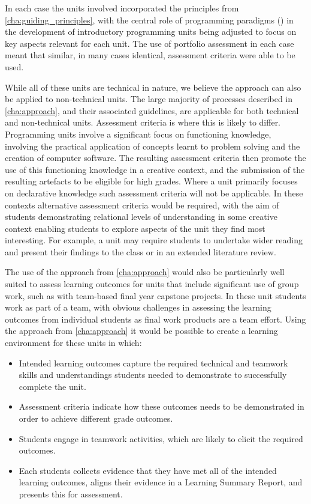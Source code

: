 In each case the units involved incorporated the principles from \cref{cha:guiding_principles}, with the central role of programming paradigms () in the development of introductory programming units being adjusted to focus on key aspects relevant for each unit. The use of portfolio assessment in each case meant that similar, in many cases identical, assessment criteria were able to be used.

While all of these units are technical in nature, we believe the approach can also be applied to non-technical units. The large majority of processes described in \cref{cha:approach}, and their associated guidelines, are applicable for both technical and non-technical units. Assessment criteria is where this is likely to differ. Programming units involve a significant focus on functioning knowledge, involving the practical application of concepts learnt to problem solving and the creation of computer software. The resulting assessment criteria then promote the use of this functioning knowledge in a creative context, and the submission of the resulting artefacts to be eligible for high grades. Where a unit primarily focuses on declarative knowledge such assessment criteria will not be applicable. In these contexts alternative assessment criteria would be required, with the aim of students demonstrating relational levels of understanding in some creative context enabling students to explore aspects of the unit they find most interesting. For example, a unit may require students to undertake wider reading and present their findings to the class or in an extended literature review.

The use of the approach from \cref{cha:approach} would also be particularly well suited to assess learning outcomes for units that include significant use of group work, such as with team-based final year capstone projects. In these unit students work as part of a team, with obvious challenges in assessing the learning outcomes from individual students as final work products are a team effort. Using the approach from \cref{cha:approach} it would be possible to create a learning environment for these units in which:
\begin{itemize}[noitemsep,nolistsep]
	\item Intended learning outcomes capture the required technical and teamwork skills and understandings students needed to demonstrate to successfully complete the unit.
	\item Assessment criteria indicate how these outcomes needs to be demonstrated in order to achieve different grade outcomes.
	\item Students engage in teamwork activities, which are likely to elicit the required outcomes.
	\item Each students collects evidence that they have met all of the intended learning outcomes, aligns their evidence in a Learning Summary Report, and presents this for assessment.
\end{itemize}


